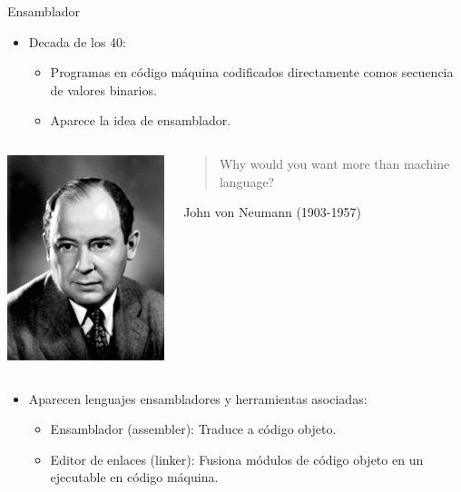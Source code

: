 \begin{frame}[t]{Ensamblador}
  \begin{itemize}
    \item Decada de los 40:
      \begin{itemize}
        \item Programas en código máquina codificados directamente comos secuencia de valores binarios.
        \item Aparece la idea de ensamblador.
      \end{itemize}
  \end{itemize}
  \pause
\begin{columns}
  \begin{column}{0.2\textwidth}
    \includegraphics[width=.8\textwidth]{images/von-neumann.jpg}
  \end{column}
  \begin{column}{0.8\textwidth}
    \begin{quote}
      Why would you want more than machine language?
    \end{quote}
    John von Neumann (1903-1957)
  \end{column}
\end{columns}
\pause
\begin{itemize}
  \item Aparecen lenguajes ensambladores y herramientas asociadas:
    \begin{itemize}
      \item Ensamblador (assembler): Traduce a código objeto.
      \item Editor de enlaces (linker): Fusiona módulos de código objeto en un ejecutable en código máquina.
    \end{itemize}
\end{itemize}
\end{frame}

